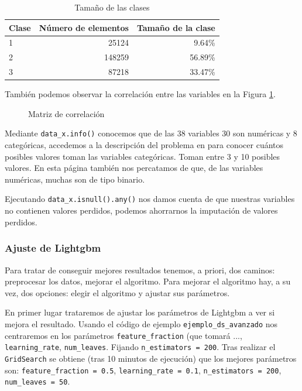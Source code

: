 \documentclass[a4paper, 20pt]{article}
\begin{document}
\begin{table}[H]
\centering
\caption{Tamaño de las clases}
\label{tab:tam_clas}
\begin{tabular}{lrr}
\toprule
Clase & Número de elementos & Tamaño de la clase\\
\midrule
1 & 25124 & 9.64\%\\
2 & 148259 & 56.89\%\\
3 & 87218 & 33.47\%\\
\bottomrule
\end{tabular}
\end{table}

También podemos observar la correlación entre las variables en la Figura \ref{fig:corr_matrix}.


\begin{figure}[H]
  \centering
  
  \caption{Matriz de correlación}
  \label{fig:corr_matrix}
\end{figure}


Mediante \texttt{data\_x.info()} conocemos que de las 38 variables 30 son numéricas y 8 categóricas, accedemos a la descripción del problema en %
para conocer cuántos posibles valores toman las variables categóricas. Toman entre 3 y 10 posibles valores. En esta página también nos percatamos de que, de las variables numéricas, muchas son de tipo binario.

Ejecutando \texttt{data\_x.isnull().any()} nos damos cuenta de que nuestras variables no contienen valores perdidos, podemos ahorrarnos la imputación de valores perdidos.


\subsubsection{Ajuste de Lightgbm}

Para tratar de conseguir mejores resultados tenemos, a priori, dos caminos: preprocesar los datos, mejorar el algoritmo. Para mejorar el algoritmo hay, a su vez, dos opciones: elegir el algoritmo y ajustar sus parámetros.

En primer lugar trataremos de ajustar los parámetros de Lightgbm a ver si mejora el resultado. Usando el código de ejemplo \texttt{ejemplo\_ds\_avanzado} nos centraremos en los parámetros \texttt{feature\_fraction} (que tomará ..., \texttt{learning\_rate}, \texttt{num\_leaves}. Fijando \texttt{n\_estimators = 200}. Tras realizar el \texttt{GridSearch} se obtiene (tras 10 minutos de ejecución) que los mejores parámetros son: \texttt{feature\_fraction = 0.5}, \texttt{learning\_rate = 0.1},  \texttt{n\_estimators = 200}, \texttt{num\_leaves = 50}.
\end{document}
